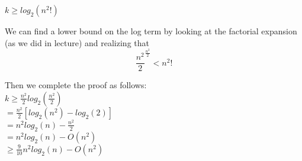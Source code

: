 \documentclass[11pt,letterpaper]{article}
\begin{document}
$k \geq log_2(n^2!)$

We can find a lower bound on the log term by looking at the factorial expansion (as we did in lecture) and realizing that
$$\frac{n^2}{2}^\frac{n^2}{2} < n^2!$$

Then we complete the proof as follows:\\
$k \geq \frac{n^2}{2} log_2(\frac{n^2}{2})   $ \\
$     = \frac{n^2}{2} [log_2(n^2) - log_2(2)]$ \\
$     = n^2 log_2(n) - \frac{n^2}{2}         $ \\
$     = n^2 log_2(n) - O(n^2)$\\
$  \geq \frac{9}{10} n^2 log_2(n) - O(n^2)$
\end{document}
